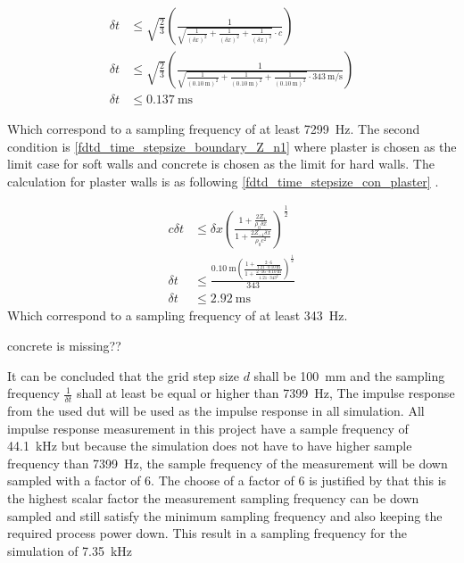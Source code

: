  
    \begin{subequations}\label{fdtd_time_stepsize_con_one}
\begin{alignat}{2}
\delta t &\leq \sqrt{\frac{2}{3}}  \left( \frac{1}{\sqrt{\frac{1}{(\delta x)^2}+\frac{1}{(\delta x)^2}+\frac{1}{(\delta x)^2} }\cdot c} \right)\\
\delta t &\leq \sqrt{\frac{2}{3}}  \left( \frac{1}{\sqrt{\frac{1}{(\SI{0.10}{\meter})^2}+\frac{1}{(\SI{0.10}{\meter})^2}+\frac{1}{(\SI{0.10}{\meter})^2} }\cdot \SI{343}{\meter\per\second}} \right)\\
\delta t &\leq \SI{0.137}{\milli\second} 
\end{alignat}
\end{subequations}
    
 Which correspond to a sampling frequency of at least \SI{7299}{\hertz}. The second condition is \autoref{fdtd_time_stepsize_boundary_Z_n1} where plaster is chosen as the limit case for soft walls and concrete is chosen as the limit for hard walls. The calculation for plaster walls is as following \autoref{fdtd_time_stepsize_con_plaster} \citep{finiteproblems}.
 
     \begin{subequations}\label{fdtd_time_stepsize_con_plaster}
\begin{alignat}{2}
c \delta t &\leq \delta x \left(   \frac{1+\frac{2Z_1}{\rho_0 \delta x}}{1+\frac{2Z_{-1} \delta x}{\rho_0 c^2}}  \right)^{\frac{1}{2}}\\
 \delta t &\leq \frac{\SI{0.10}{\meter} \left(   \frac{1+\frac{2\cdot 6}{1.21 \cdot \SI{0.10}{\meter}}}{1+\frac{2 \cdot 16 \cdot \SI{0.10}{\meter}}{1.21 \cdot {343}^2}}  \right)^{\frac{1}{2}}}{343}\\
\delta t &\leq \SI{2.92}{\milli\second} 
\end{alignat}
\end{subequations}
 Which correspond to a sampling frequency of at least \SI{343}{\hertz}.


concrete is missing??


It can be concluded that the grid step size $d$ shall be \SI{100}{\milli\meter} and the sampling frequency $\frac{1}{\delta t}$ shall at least be equal or higher than \SI{7399}{\hertz}, The impulse response from the used \gls{dut} will be used as the impulse response in all simulation. All impulse response measurement in this project have a sample frequency of \SI{44.1}{\kilo\hertz} but because the simulation does not have to have higher sample frequency than \SI{7399}{\hertz}, the sample frequency of the measurement will be down sampled with a factor of 6. The choose of a factor of 6 is justified by that this is the highest scalar factor the measurement sampling frequency can be down sampled  and still satisfy the minimum sampling frequency and also keeping the required process power down. This result in a sampling frequency for the simulation of \SI{7.35}{\kilo\hertz}

